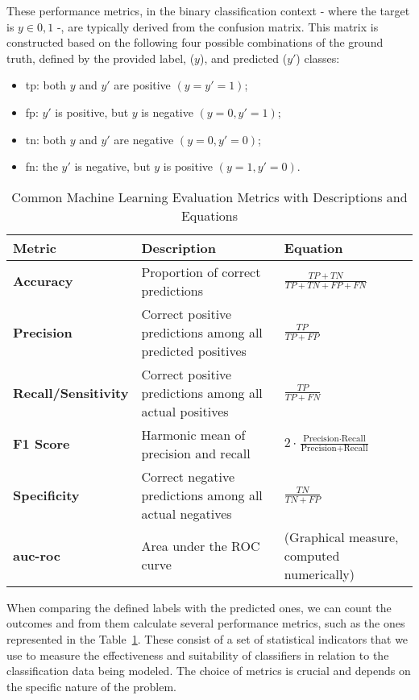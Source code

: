 These performance metrics, in the binary classification context - where the target is $y\in{0,1}$ -, are typically derived from the confusion matrix. This matrix is constructed based on the following four possible combinations of the ground truth, defined by the provided label, ($y$), and predicted ($y'$) classes:
\begin{itemize}
    \item \ac{tp}: both $y$ and $y'$ are positive $(y = y' = 1)$;
    \item \ac{fp}: $y'$ is positive, but $y$ is negative $(y=0, y' = 1)$;
    \item \ac{tn}: both $y$ and $y'$ are negative $(y=0, y'=0)$;
    \item  \ac{fn}: the $y'$ is negative, but $y$ is positive $(y=1,y'= 0)$.
\end{itemize}

\begin{table}[htbp]
\centering
\renewcommand{\arraystretch}{1.4}
\setlength{\tabcolsep}{6pt}
\caption{Common Machine Learning Evaluation Metrics with Descriptions and Equations}
\label{tab:ml_metrics}
\begin{tabular}{@{}>{\bfseries}m{3cm} m{6cm} m{6cm}@{}}
\toprule
Metric & Description & Equation \\
\midrule
Accuracy & Proportion of correct predictions &
$\displaystyle \frac{TP + TN}{TP + TN + FP + FN}$ \\
Precision & Correct positive predictions among all predicted positives &
$\displaystyle \frac{TP}{TP + FP}$ \\
Recall/Sensitivity & Correct positive predictions among all actual positives &
$\displaystyle \frac{TP}{TP + FN}$ \\
F1 Score & Harmonic mean of precision and recall &
$\displaystyle 2 \cdot \frac{\text{Precision} \cdot \text{Recall}}{\text{Precision} + \text{Recall}}$ \\
Specificity & Correct negative predictions among all actual negatives &
$\displaystyle \frac{TN}{TN + FP}$ \\
\acs{auc-roc} & Area under the ROC curve &
(Graphical measure, computed numerically) \\
\bottomrule
\end{tabular}
\end{table}

When comparing the defined labels with the predicted ones, we can count the outcomes and from them calculate several performance metrics, such as the ones represented in the Table~\ref{tab:ml_metrics}.
These consist of a set of statistical indicators that we use to measure the effectiveness and suitability of classifiers in relation to the classification data being modeled.
The choice of metrics is crucial and depends on the specific nature of the problem.

